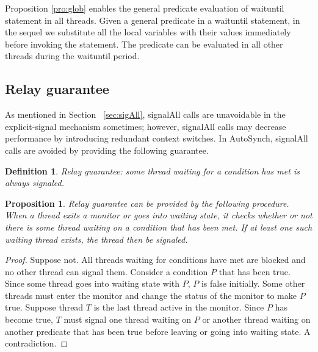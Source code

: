 \documentclass[preprint]{sigplanconf}
\newtheorem{definition}{Definition}
\newtheorem{proposition}{Proposition}
\begin{document}
Proposition \ref{pro:glob} enables the general predicate evaluation of
waituntil statement in all threads. 
Given a general predicate in a waituntil statement, in the sequel we substitute
all the local variables with their values immediately before invoking the
statement. The predicate can be evaluated in all other threads during the
waituntil period. 

\subsection{Relay guarantee}
As mentioned in Section ~\ref{sec:sigAll}, signalAll calls are unavoidable in
the explicit-signal mechanism sometimes; however, signalAll calls may decrease
performance by introducing redundant context switches. 
In
AutoSynch, signalAll calls are avoided by providing the following guarantee. 

\begin{definition}{Relay guarantee:}
    some thread waiting for a condition has met is always signaled. 
    
\end{definition}
\begin{proposition} \label{pro:one}
    Relay guarantee can be provided by the following procedure. When a thread 
    exits a monitor or goes into waiting state, it checks whether or not there 
    is some thread waiting on a condition that has been met. If
    at least one such waiting thread exists, the thread then be signaled.
\end{proposition}
\begin{proof}
    Suppose not. All threads waiting for conditions have met are blocked and 
    no other thread can signal them. Consider a condition $P$ that has been 
    true. Since some thread goes into waiting state with $P$, $P$ is false
    initially. Some other threads must enter the monitor and change the status 
    of the monitor to make $P$ true. Suppose thread $T$ is the last thread 
    active in the monitor. Since $P$ has become true, $T$ must signal one 
    thread waiting on $P$ or another thread waiting on another predicate that
    has been true before leaving or going into waiting state. A contradiction. 
 \end{proof}
\end{document}
